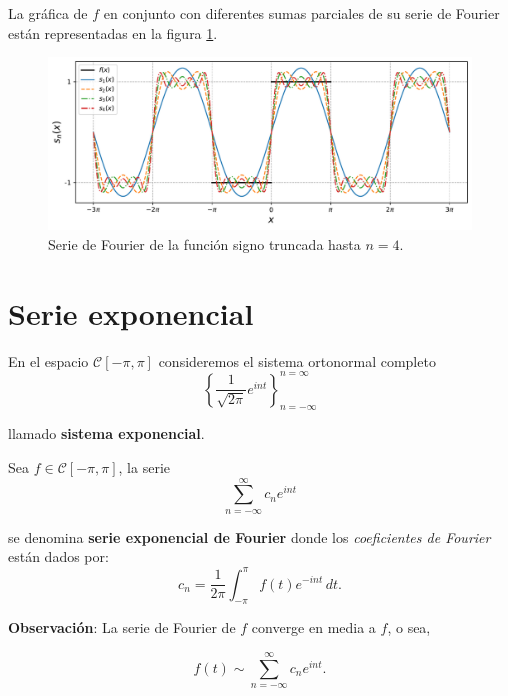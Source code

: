 \begin{ejemplo}
La gráfica de $f$ en conjunto con diferentes sumas parciales de su serie de Fourier están representadas en la figura \ref{fig:EjemploFourier2}.

\begin{figure}[H]
    \centering
    \includegraphics[scale = 0.65]{Figuras/EjemploFourier2.pdf}
    \caption{Serie de Fourier de la función signo truncada hasta $n = 4$.}
     \label{fig:EjemploFourier2}
\end{figure}

\end{ejemplo}

\section{Serie exponencial}

En el espacio $\mathcal{C}[-\pi,\pi]$ consideremos el sistema ortonormal completo 
$$\left\{ \frac{1}{\sqrt{2\pi}} e^{int} \right\}_{n= - \infty}^{n = \infty}$$

llamado \textbf{sistema exponencial}.

\begin{defi}
Sea $f \in \mathcal{C}[-\pi,\pi]$, la serie 
\begin{equation}
     \sum_{n=- \infty}^{\infty} c_n e^{int} \label{FourierExpo}
\end{equation}

se denomina \textbf{serie exponencial de Fourier}  donde los \textit{coeficientes de Fourier} están dados por:
\begin{equation*}
    c_n = \frac{1}{2\pi} \int_{-\pi}^{\pi} f(t) e^{-int} \,dt.
\end{equation*}
\end{defi}

\textbf{Observación}: La serie de Fourier de $f$ converge en media a $f$, o sea, 
\begin{shaded}
 $$f(t) \sim \sum_{n=- \infty}^{\infty} c_n e^{int}.$$   
\end{shaded}

